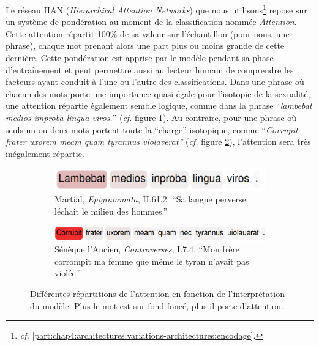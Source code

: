 
Le réseau HAN (\textit{Hierarchical Attention Networks}) que nous utilisons\footnote{\textit{cf.} \ref{part:chap4:architectures:variations-architectures:encodage}.} repose sur un système de pondération au moment de la classification nommée \textit{Attention}. Cette attention répartit 100\% de sa valeur sur l'échantillon (pour nous, une phrase), chaque mot prenant alors une part plus ou moins grande de cette dernière. Cette pondération est apprise par le modèle pendant sa phase d'entraînement et peut permettre aussi au lecteur humain de comprendre les facteurs ayant conduit à l'une ou l'autre des classifications. Dans une phrase où chacun des mots porte une importance quasi égale pour l'isotopie de la sexualité, une attention répartie également semble logique, comme dans la phrase ``\textit{lambebat medios improba lingua viros.}'' (\textit{cf.} figure \ref{fig:chap4:attention:repartie}). Au contraire, pour une phrase où seuls un ou deux mots portent toute la ``charge'' isotopique, comme ``\textit{Corrupit frater uxorem meam quam tyrannus violaverat''} (\textit{cf.} figure \ref{fig:chap4:attention:mono}), l'attention sera très inégalement répartie.

\begin{figure}
     \centering
     \begin{subfigure}[t]{0.45\textwidth}
         \centering
         \includegraphics[width=\textwidth]{figures/chap4/attention.png}
         \caption{Martial, \textit{Epigrammata}, II.61.2. ``Sa langue perverse léchait le milieu des hommes.''}
         \label{fig:chap4:attention:repartie}
     \end{subfigure}
     \hfill
     \begin{subfigure}[t]{0.45\textwidth}
         \centering
         \includegraphics[width=\textwidth]{figures/chap4/attention2.png}
         \caption{Sénèque l'Ancien, \textit{Controverses}, I.7.4. ``Mon frère corrompit ma femme que même le tyran n'avait pas violée.''}
         \label{fig:chap4:attention:mono}
     \end{subfigure}
    \caption{Différentes répartitions de l'attention en fonction de l'interprétation du modèle. Plus le mot est sur fond foncé, plus il porte d'attention.}
    \label{fig:chap4:attention}
\end{figure}

